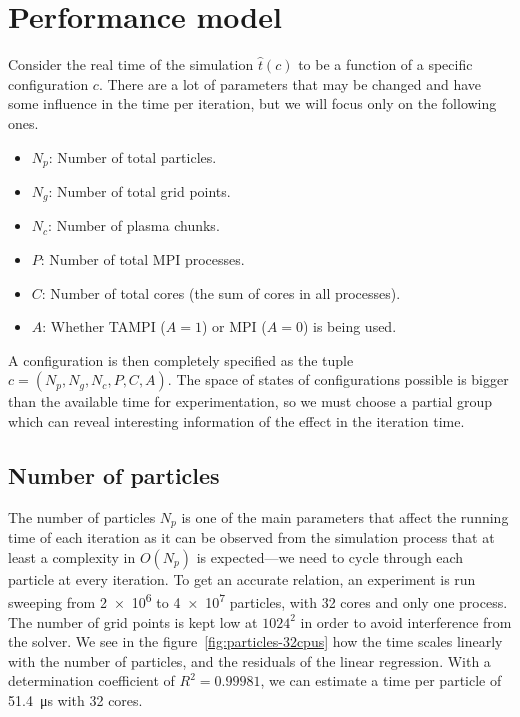 %
\vspace{1em}

\section{Performance model}

Consider the real time of the simulation $\hat t(c)$ to be a function of a 
specific configuration $c$. There are a lot of parameters that may be changed 
and have some influence in the time per iteration, but we will focus only on the 
following ones.
%
\begin{itemize}
\item $N_p$: Number of total particles.
\item $N_g$: Number of total grid points.
\item $N_c$: Number of plasma chunks.
\item $P$: Number of total MPI processes.
\item $C$: Number of total cores (the sum of cores in all processes).
\item $A$: Whether TAMPI ($A = 1$) or MPI ($A=0$) is being used.
\end{itemize}
%
A configuration is then completely specified as the tuple $c = (N_p, N_g, N_c, 
P, C, A)$. The space of states of configurations possible is bigger than the 
available time for experimentation, so we must choose a partial group which can 
reveal interesting information of the effect in the iteration time.
%
\subsection{Number of particles}

The number of particles $N_p$ is one of the main parameters that affect the
running time of each iteration as it can be observed from the simulation process 
that at least a complexity in $O(N_p)$ is expected---we need to cycle through 
each particle at every iteration. To get an accurate relation, an experiment is 
run sweeping from \num{2e6} to \num{4e7} particles, with 32 cores and only one 
process. The number of grid points is kept low at $1024^2$ in order to avoid 
interference from the solver. We see in the figure~\ref{fig:particles-32cpus} 
how the time scales linearly with the number of particles, and the residuals of 
the linear regression. With a determination coefficient of $R^2 = 0.99981$, we 
can estimate a time per particle of \SI{51.4}{\micro\second} with 32 cores.

